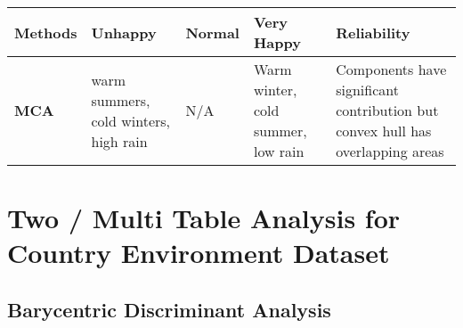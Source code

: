 \documentclass[]{book}
\begin{document}
\begin{longtable}[]{@{}lllll@{}}
\toprule
\begin{minipage}[b]{0.15\columnwidth}\raggedright
\textbf{Methods}\strut
\end{minipage} & \begin{minipage}[b]{0.20\columnwidth}\raggedright
\textbf{Unhappy}\strut
\end{minipage} & \begin{minipage}[b]{0.19\columnwidth}\raggedright
\textbf{Normal}\strut
\end{minipage} & \begin{minipage}[b]{0.22\columnwidth}\raggedright
\textbf{Very Happy}\strut
\end{minipage} & \begin{minipage}[b]{0.10\columnwidth}\raggedright
\textbf{Reliability}\strut
\end{minipage}\tabularnewline
\midrule
\endhead
\begin{minipage}[t]{0.15\columnwidth}\raggedright
\textbf{MCA}\strut
\end{minipage} & \begin{minipage}[t]{0.20\columnwidth}\raggedright
warm summers, cold winters, high rain\strut
\end{minipage} & \begin{minipage}[t]{0.19\columnwidth}\raggedright
N/A\strut
\end{minipage} & \begin{minipage}[t]{0.22\columnwidth}\raggedright
Warm winter, cold summer, low rain\strut
\end{minipage} & \begin{minipage}[t]{0.10\columnwidth}\raggedright
Components have significant contribution but convex hull has overlapping
areas\strut
\end{minipage}\tabularnewline
\bottomrule
\end{longtable}

\hypertarget{part-two-multi-table-analysis-for-country-environment-dataset}{%
\part{Two / Multi Table Analysis for Country Environment
Dataset}\label{part-two-multi-table-analysis-for-country-environment-dataset}}

\hypertarget{barycentric-discriminant-analysis}{%
\chapter{Barycentric Discriminant
Analysis}\label{barycentric-discriminant-analysis}}
\end{document}
